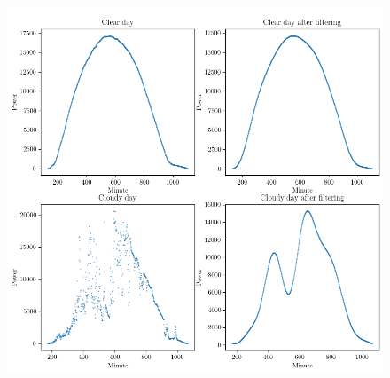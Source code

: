 


\begin{figure}[h]
\centering
\includegraphics[width=0.8\linewidth]{pics/cloudfree_algo}
\label{fig_cloudfree_algo}
\end{figure}



\newpage






